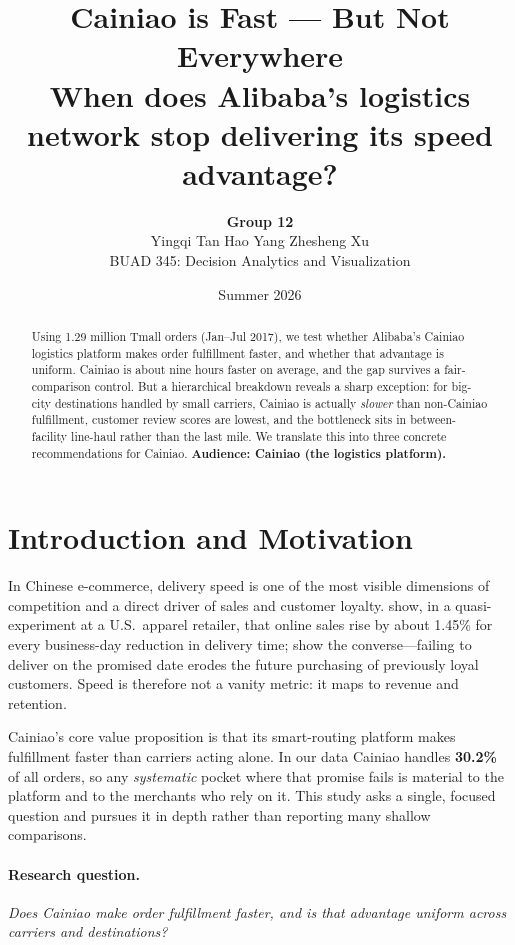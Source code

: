 \documentclass[11pt]{article}
\title{\vspace{-1.5em}\textbf{Cainiao is Fast --- But Not Everywhere}\\[0.25em]
\large When does Alibaba's logistics network stop delivering its speed advantage?}
\author{\textbf{Group 12} \\
Yingqi Tan \textbullet{} Hao Yang \textbullet{} Zhesheng Xu \\
BUAD 345: Decision Analytics and Visualization}
\date{Summer 2026}
\begin{document}
\maketitle
\vspace{-1.2em}

\begin{abstract}
\noindent Using 1.29 million Tmall orders (Jan--Jul 2017), we test whether
Alibaba's Cainiao logistics platform makes order fulfillment faster, and whether
that advantage is uniform. Cainiao is about nine hours faster on average, and the
gap survives a fair-comparison control. But a hierarchical breakdown reveals a
sharp exception: for big-city destinations handled by small carriers, Cainiao is
actually \emph{slower} than non-Cainiao fulfillment, customer review scores are
lowest, and the bottleneck sits in between-facility line-haul rather than the
last mile. We translate this into three concrete recommendations for Cainiao.
\textbf{Audience: Cainiao (the logistics platform).}
\end{abstract}

\section{Introduction and Motivation}
In Chinese e-commerce, delivery speed is one of the most visible dimensions of
competition and a direct driver of sales and customer loyalty. \citet{fisher2019}
show, in a quasi-experiment at a U.S.\ apparel retailer, that online sales rise by
about 1.45\% for every business-day reduction in delivery time; \citet{rao2011}
show the converse---failing to deliver on the promised date erodes the future
purchasing of previously loyal customers. Speed is therefore not a vanity metric:
it maps to revenue and retention.

Cainiao's core value proposition is that its smart-routing platform makes
fulfillment faster than carriers acting alone. In our data Cainiao handles
\textbf{30.2\%} of all orders, so any \emph{systematic} pocket where that promise
fails is material to the platform and to the merchants who rely on it. This study
asks a single, focused question and pursues it in depth rather than reporting many
shallow comparisons.

\paragraph{Research question.} \emph{Does Cainiao make order fulfillment faster,
and is that advantage uniform across carriers and destinations?}
\end{document}
